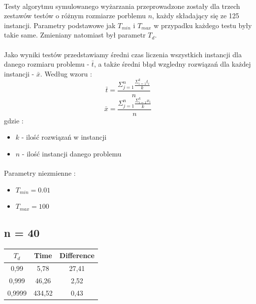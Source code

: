 \documentclass[wide,a4paper,titlepage,12pt] {article}
\begin{document}
\paragraph{}
Testy algorytmu symulowanego wyżarzania przeprowadzone zostały dla trzech zestawów testów o różnym rozmiarze porblemu $n$, każdy składający się ze 125 instancji. Parametry podstawowe jak $T_{min}$ i $T_{max}$ w przypadku każdego testu były takie same. Zmieniany natomiast był parametr $T_{d}$.
\paragraph{}
Jako wyniki testów przedstawiamy średni czas liczenia wszystkich instancji dla danego rozmiaru problemu - $\bar{t}$, a także średni błąd wzgledny  rozwiązań dla każdej instancji - $\bar{x}$. Według wzoru : \\
\begin{equation}
	\bar{t} = \frac{\Sigma_{j=1}^{n}\frac{\Sigma_{i=1}^{k}t_{i}}{k}}{n}
\end{equation}
\begin{equation}
	\bar{x} = \frac{\Sigma_{j=1}^{n}\frac{\Sigma_{i=1}^{k}x_{i}}{k}}{n}
\end{equation}
gdzie : \\
\begin{itemize}
  \item $k$ - ilość rozwiązań w instancji
  \item $n$ - ilość instancji danego problemu
\end{itemize}
\paragraph{}
Parametry niezmienne : 
\begin{itemize}
  \item $T_{min} = 0.01$
  \item $T_{max} = 100$
\end{itemize}
\newpage
\subsection{n = 40}
\begin{center}
    \begin{tabular}{|c|c|c|}
      \hline
       $T_{d}$ & Time & Difference \\ \hline
       0,99 & 5,78 & 27,41 \\ \hline
       0,999 & 46,26 & 2,52 \\ \hline
       0,9999 & 434,52 & 0,43 \\ \hline
  \end{tabular}
\end{center}
\end{document}

